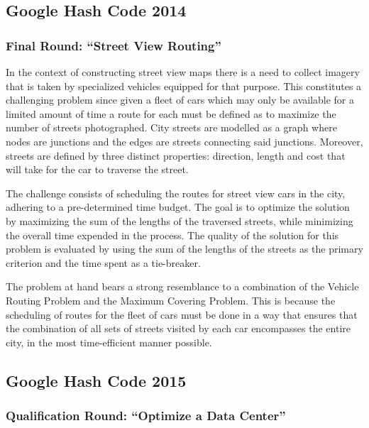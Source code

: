 \subsection{Google Hash Code 2014}
\label{section:hashcode2014}

\subsubsection{Final Round: ``Street View Routing''}
\label{section:hashcode2014-final}

In the context of constructing street view maps there is a need to collect
imagery that is taken by specialized vehicles equipped for that purpose. This
constitutes a challenging problem since given a fleet of cars which may only be
available for a limited amount of time a route for each must be defined as to
maximize the number of streets photographed. City streets are modelled as a
graph where nodes are junctions and the edges are streets connecting said
junctions. Moreover, streets are defined by three distinct properties:
direction, length and cost that will take for the car to traverse the
street.

The challenge consists of scheduling the routes for street view cars in the city,
adhering to a pre-determined time budget. The goal is to optimize the solution
by maximizing the sum of the lengths of the traversed streets, while minimizing
the overall time expended in the process. The quality of the solution for this
problem is evaluated by using the sum of the lengths of the streets as the
primary criterion and the time spent as a tie-breaker.

The problem at hand bears a strong resemblance to a combination of the Vehicle
Routing Problem and the Maximum Covering Problem. This is because
the scheduling of routes for the fleet of cars must be done in a way that
ensures that the combination of all sets of streets visited by each car
encompasses the entire city, in the most time-efficient manner possible.

\subsection{Google Hash Code 2015}
\label{section:hashcode2015}

\subsubsection{Qualification Round: ``Optimize a Data Center''}
\label{section:hashcode2015-qualification}


